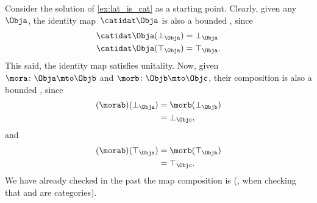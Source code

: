 \begin{solution}
    Consider the solution of \cref{ex:lat_is_cat} as a starting point.
    Clearly, given any ~$\Obja$, the identity map~$\catidat\Obja$ is also a bounded , since
    \begin{equation}
        \begin{aligned}
            \catidat\Obja(\bot_\Obja) & =\bot_\Obja \\
            \catidat\Obja(\top_\Obja) & =\top_\Obja.
        \end{aligned}
    \end{equation}
    This said, the identity map satisfies unitality.
    Now, given  $\mora\colon \Obja \mto \Objb$ and  $\morb\colon \Objb\mto \Objc$, their composition is also a bounded , since
    \begin{equation}
        \begin{aligned}
            (\morab)(\bot_\Obja)
             & = \morb(\bot_\Objb) \\
             & = \bot_\Objc,
        \end{aligned}
    \end{equation}
    and
    \begin{equation}
        \begin{aligned}
            (\morab)(\top_\Obja)
             & = \morb(\top_\Objb) \\
             & = \top_\Objc.
        \end{aligned}
    \end{equation}
    We have already checked in the past the map composition is  (\eg, when checking that \Set and \Pos are categories).
\end{solution}

